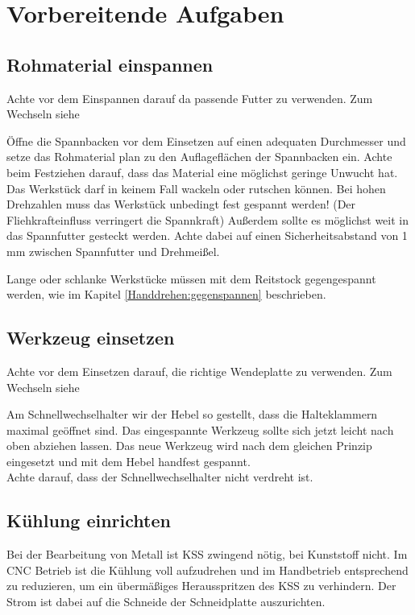 \documentclass{\basedir/fablab-document}
\begin{document}
\clearpage

\newpage
\section{Vorbereitende Aufgaben}
\subsection{Rohmaterial einspannen}

Achte vor dem Einspannen darauf da passende Futter zu verwenden. Zum Wechseln siehe 

Öffne die Spannbacken vor dem Einsetzen auf einen adequaten Durchmesser und setze das Rohmaterial plan zu den Auflageflächen der Spannbacken ein. Achte beim Festziehen darauf, dass das Material eine möglichst geringe Unwucht hat. Das Werkstück darf in keinem Fall wackeln oder rutschen können. Bei hohen Drehzahlen muss das Werkstück unbedingt fest gespannt werden! (Der Fliehkrafteinfluss verringert die Spannkraft) Außerdem sollte es möglichst weit in das Spannfutter gesteckt werden. Achte dabei auf einen Sicherheitsabstand von 1\,mm zwischen Spannfutter und Drehmeißel.

Lange oder schlanke Werkstücke müssen mit dem Reitstock gegengespannt werden, wie im Kapitel \ref{Handdrehen:gegenspannen} beschrieben.

\subsection{Werkzeug einsetzen} %
Achte vor dem Einsetzen darauf, die richtige Wendeplatte zu verwenden. Zum Wechseln siehe 

Am Schnellwechselhalter wir der Hebel so gestellt, dass die Halteklammern maximal geöffnet sind. Das eingespannte Werkzeug sollte sich jetzt leicht nach oben abziehen lassen. Das neue Werkzeug wird nach dem gleichen Prinzip eingesetzt und mit dem Hebel handfest gespannt.\\

Achte darauf, dass der Schnellwechselhalter nicht verdreht ist.

\subsection{Kühlung einrichten}

Bei der Bearbeitung von Metall ist KSS zwingend nötig, bei Kunststoff nicht. Im CNC Betrieb ist die Kühlung voll aufzudrehen und im Handbetrieb entsprechend zu reduzieren, um ein übermäßiges Herausspritzen des KSS zu verhindern. Der Strom ist dabei auf die Schneide der Schneidplatte auszurichten.
\end{document}
